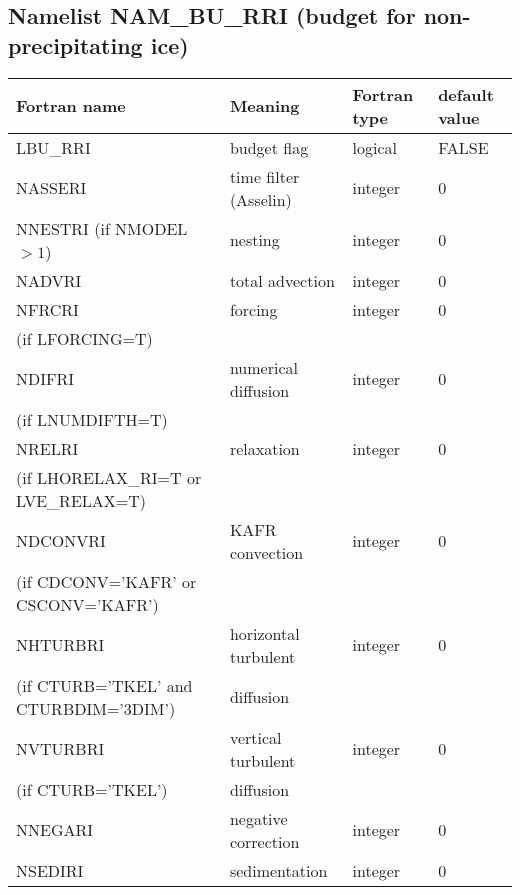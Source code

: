 \subsection{Namelist NAM\_BU\_RRI (budget for non-precipitating ice)}

\begin{center}
\begin{tabular} {|p{8cm}|p{4cm}|>{\centering}p{1.5cm}|p{1.5cm}<{\centering}|}
\hline
Fortran name & Meaning & Fortran type & default value \\
\hline\hline
LBU\_RRI & budget flag & logical & FALSE\index{LBU\_RRI!\innam{NAM\_BU\_RRI}} \\\hline
NASSERI  & time filter (Asselin)   & integer  &  0 \index{NASSERI!\innam{NAM\_BU\_RRI}} \\\hline
NNESTRI (if NMODEL$>1$) & nesting           & integer  &  0 \index{NNESTRI!\innam{NAM\_BU\_RRI}} \\\hline
NADVRI   & total advection   & integer  &  0 \index{NADVRI!\innam{NAM\_BU\_RTH}}\\\hline
NFRCRI   & forcing           & integer  &  0 \index{NFRCRI!\innam{NAM\_BU\_RRI}} \\
(if LFORCING=T) &  &   &   \\\hline
NDIFRI   & numerical diffusion & integer  &  0 \index{NDIFRI!\innam{NAM\_BU\_RRI}} \\
(if LNUMDIFTH=T) &  &   &   \\\hline
NRELRI   & relaxation        & integer  &  0 \index{NRELRI!\innam{NAM\_BU\_RRI}}\\
(if LHORELAX\_RI=T or LVE\_RELAX=T) &  &   &   \\\hline
NDCONVRI & KAFR convection   & integer  &  0 \index{NDCONVRI!\innam{NAM\_BU\_RRI}} \\
(if CDCONV='KAFR' or CSCONV='KAFR') &  &   &   \\\hline
NHTURBRI & horizontal turbulent  & integer  &  0 \index{NHTURBRI!\innam{NAM\_BU\_RRI}}\\
(if CTURB='TKEL' and CTURBDIM='3DIM') &diffusion &   &  \\\hline
NVTURBRI & vertical turbulent  & integer  &  0 \index{NVTURBRI!\innam{NAM\_BU\_RRI}}\\
(if CTURB='TKEL') &diffusion &   &  \\\hline
NNEGARI  & negative correction & integer  &  0 \index{NNEGARI!\innam{NAM\_BU\_RRI}}\\\hline
NSEDIRI  & sedimentation  & integer  &  0 \index{NSEDIRI!\innam{NAM\_BU\_RRI}}\\

\end{tabular}
\end{center}
